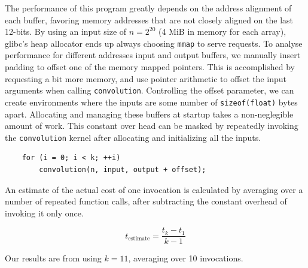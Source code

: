 \documentclass[a4paper,10pt,twocolumn,twoside]{article}
\begin{document}
{

The performance of this program greatly depends on the address alignment of each buffer, favoring memory addresses that are not closely aligned on the last 12-bits.
By using an input size of $n=2^{20}$ (4 MiB in memory for each array), glibc's heap allocator ends up always choosing \texttt{mmap} to serve requests.
To analyse performance for different addresses input and output buffers, we manually insert padding to offset one of the memory mapped pointers.
This is accomplished by requesting a bit more memory, and use pointer arithmetic to offset the input arguments when calling \texttt{convolution}.
Controlling the offset parameter, we can create environments where the inputs are some number of \texttt{sizeof(float)} bytes apart.
Allocating and managing these buffers at startup takes a non-neglegible amount of work.
This constant over head can be masked by repeatedly invoking the \texttt{convolution} kernel after allocating and initializing all the inputs.
\begin{lstlisting}
    for (i = 0; i < k; ++i)
        convolution(n, input, output + offset);
\end{lstlisting}
An estimate of the actual cost of one invocation is calculated by averaging over a number of repeated function calls, after subtracting the constant overhead of invoking it only once.

\[
t_{\text{estimate}} = \frac{t_{k} - t_{1}}{k - 1}
\]

Our results are from using $k=11$, averaging over 10 invocations.

}
\end{document}
